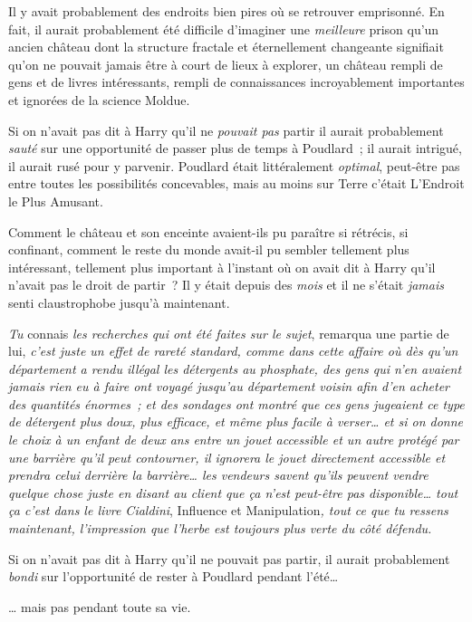 Il y avait probablement des endroits bien pires où se retrouver emprisonné. En fait, il aurait probablement été difficile d'imaginer une \emph{meilleure} prison qu'un ancien château dont la structure fractale et éternellement changeante signifiait qu'on ne pouvait jamais être à court de lieux à explorer, un château rempli de gens et de livres intéressants, rempli de connaissances incroyablement importantes et ignorées de la science Moldue.

Si on n'avait pas dit à Harry qu'il ne \emph{pouvait pas} partir il aurait probablement \emph{sauté} sur une opportunité de passer plus de temps à Poudlard~; il aurait intrigué, il aurait rusé pour y parvenir. Poudlard était littéralement \emph{optimal}, peut-être pas entre toutes les possibilités concevables, mais au moins sur Terre c'était L'Endroit le Plus Amusant.

Comment le château et son enceinte avaient-ils pu paraître si rétrécis, si confinant, comment le reste du monde avait-il pu sembler tellement plus intéressant, tellement plus important à l'instant où on avait dit à Harry qu'il n'avait pas le droit de partir~? Il y était depuis des \emph{mois} et il ne s'était \emph{jamais} senti claustrophobe jusqu'à maintenant.

\emph{Tu} connais \emph{les recherches qui ont été faites sur le sujet}, remarqua une partie de lui, \emph{c'est juste un effet de rareté standard, comme dans cette affaire où dès qu'un département a rendu illégal les détergents au phosphate, des gens qui n'en avaient jamais rien eu à faire ont voyagé jusqu'au département voisin afin d'en acheter des quantités énormes~; et des sondages ont montré que ces gens jugeaient ce type de détergent plus doux, plus efficace, et même plus facile à verser… et si on donne le choix à un enfant de deux ans entre un jouet accessible et un autre protégé par une barrière qu'il peut contourner, il ignorera le jouet directement accessible et prendra celui derrière la barrière… les vendeurs savent qu'ils peuvent vendre quelque chose juste en disant au client que ça n'est peut-être pas disponible… tout ça c'est dans le livre Cialdini}, Influence et Manipulation\emph{, tout ce que tu ressens maintenant, l'impression que l'herbe est toujours plus verte du côté défendu.}

Si on n'avait pas dit à Harry qu'il ne pouvait pas partir, il aurait probablement \emph{bondi} sur l'opportunité de rester à Poudlard pendant l'été…

… mais pas pendant toute sa vie.

